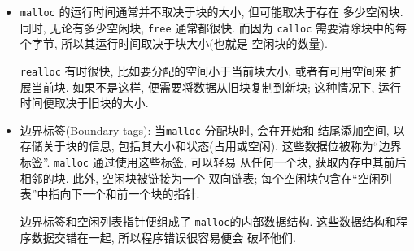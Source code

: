\documentclass[12pt]{book}
\begin{document}
{\begin{itemize}

\item {\tt malloc} 的运行时间通常并不取决于块的大小, 但可能取决于存在
多少空闲块.  同时, 无论有多少空闲块, {\tt free} 通常都很快. 而因为
{\tt calloc} 需要清除块中的每个字节, 所以其运行时间取决于块大小(也就是
空闲块的数量).

{\tt realloc} 有时很快, 比如要分配的空间小于当前块大小, 或者有可用空间来
扩展当前块. 如果不是这样, 便需要将数据从旧块复制到新块; 这种情况下, 
运行时间便取决于旧块的大小. 

\item 边界标签(Boundary tags): 当{\tt malloc} 分配块时, 会在开始和
  结尾添加空间, 以存储关于块的信息, 包括其大小和状态(占用或空闲).
  这些数据位被称为``边界标签''.  {\tt malloc} 通过使用这些标签, 可以轻易
  从任何一个块, 获取内存中其前后相邻的块. 此外, 空闲块被链接为一个
  双向链表; 每个空闲块包含在``空闲列表''中指向下一个和前一个块的指针. 

边界标签和空闲列表指针便组成了 {\tt malloc}的内部数据结构. 
这些数据结构和程序数据交错在一起, 所以程序错误很容易便会
破坏他们. 


\end{itemize}}
\end{document}
